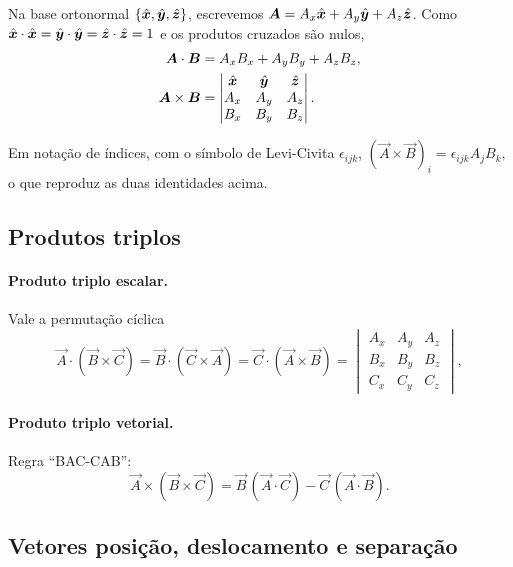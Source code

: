 Na base ortonormal $\{\hat{\bm{x}},\hat{\bm{y}},\hat{\bm{z}}\}$, escrevemos
$\bm{A}=A_x\hat{\bm{x}}+A_y\hat{\bm{y}}+A_z\hat{\bm{z}}$. Como
$\hat{\bm{x}}\cdot\hat{\bm{x}}=\hat{\bm{y}}\cdot\hat{\bm{y}}=\hat{\bm{z}}\cdot\hat{\bm{z}}=1$ e os produtos
cruzados são nulos,
\begin{align}
  \bm{A}\cdot\bm{B}&=A_xB_x+A_yB_y+A_zB_z,\\
  \bm{A}\times\bm{B}&=
  \begin{vmatrix}
    \hat{\bm{x}} & \hat{\bm{y}} & \hat{\bm{z}}\\
    A_x & A_y & A_z\\
    B_x & B_y & B_z
  \end{vmatrix}.
\end{align}
\begin{nota}
Em notação de índices, com o símbolo de Levi-Civita $\epsilon_{ijk}$,
\(
  (\vec{A}\times\vec{B})_i=\epsilon_{ijk}A_jB_k,
\)
o que reproduz as duas identidades acima.
\end{nota}

\subsection{Produtos triplos}

\paragraph{Produto triplo escalar.} Vale a permutação cíclica
\begin{equation}
  \vec{A}\cdot(\vec{B}\times\vec{C})
  =\vec{B}\cdot(\vec{C}\times\vec{A})
  =\vec{C}\cdot(\vec{A}\times\vec{B})
  =\begin{vmatrix}
    A_x & A_y & A_z\\ B_x & B_y & B_z\\ C_x & C_y & C_z
  \end{vmatrix},
\end{equation}

\paragraph{Produto triplo vetorial.} Regra ``BAC-CAB'':
\begin{equation}
  \vec{A}\times(\vec{B}\times\vec{C})
  =\vec{B}\,(\vec{A}\cdot\vec{C})-\vec{C}\,(\vec{A}\cdot\vec{B}).
\end{equation}

\subsection{Vetores posição, deslocamento e separação}

